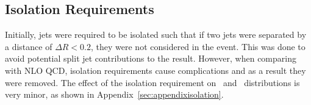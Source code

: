 \subsection{Isolation Requirements}
Initially, jets were required to be isolated such that if two jets were separated by a distance of $\Delta R < 0.2$, they were not considered in the event. This was done to avoid potential split jet contributions to the result. However, when comparing with NLO QCD, isolation requirements cause complications and as a result they were removed. The effect of the isolation requirement on \conetwo\ and \ionetwo\ distributions is very minor, as shown in Appendix~\ref{sec:appendixisolation}.


\FloatBarrier

